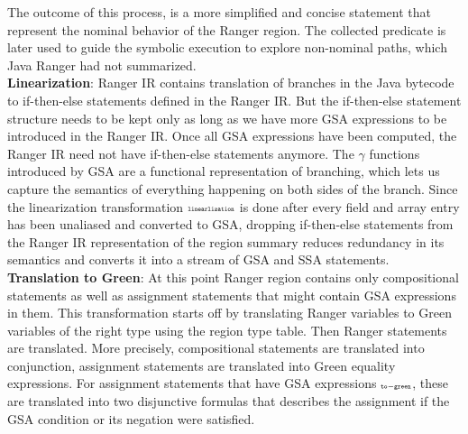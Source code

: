 %
The outcome of this process, is a more simplified and concise statement that represent the nominal behavior of the Ranger region.
%
The collected predicate is later used to guide the symbolic execution to explore non-nominal paths, which Java Ranger
had not summarized.  \\
%
\textbf{Linearization}:
Ranger IR contains translation of branches in the Java bytecode to if-then-else statements defined in the Ranger IR.
%
But the if-then-else statement structure needs to be kept only as long as we have more GSA expressions to be
introduced in the Ranger IR.
%
Once all GSA expressions have been computed, the Ranger IR need not have if-then-else statements anymore.
%
The $\gamma$ functions introduced by GSA are a functional representation of branching, which lets us
capture the semantics of everything happening on both sides of the branch.
%
Since the linearization transformation $\scriptscriptstyle\mathtt{linearlization}$ is done after every field and array entry has been unaliased and converted to
GSA, dropping if-then-else statements from the Ranger IR representation of the region summary reduces redundancy in its
semantics and converts it into a stream of GSA and SSA statements.\\
\textbf{Translation to Green}:
%
At this point Ranger region contains only compositional statements as well as assignment statements that might contain GSA expressions in them.
%
This transformation starts off by translating Ranger variables to Green variables of the right type using the region type table.
%
Then Ranger statements are translated. More precisely, compositional statements are translated into conjunction, assignment statements are translated into Green equality expressions.
%
For assignment statements that have GSA expressions $\scriptscriptstyle\mathtt{to-green}$, these are translated into two disjunctive formulas that describes the assignment if the GSA condition or its negation were satisfied. 

